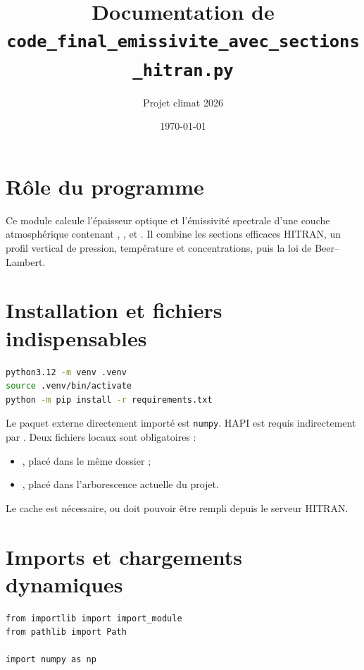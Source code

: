 \documentclass[11pt,a4paper]{article}
\title{Documentation de \texttt{code\_final\_emissivite\_avec\_sections\_hitran.py}}
\author{Projet climat 2026}
\date{\today}
\begin{document}
\maketitle
\tableofcontents

\section{Rôle du programme}

Ce module calcule l'épaisseur optique et l'émissivité spectrale d'une couche
atmosphérique contenant , ,  et . Il combine
les sections efficaces HITRAN, un profil vertical de pression, température et
concentrations, puis la loi de Beer--Lambert.

\section{Installation et fichiers indispensables}

\begin{lstlisting}[language=bash]
python3.12 -m venv .venv
source .venv/bin/activate
python -m pip install -r requirements.txt
\end{lstlisting}

Le paquet externe directement importé est \texttt{numpy}. HAPI est requis
indirectement par . Deux fichiers
locaux sont obligatoires :

\begin{itemize}
  \item {}, placé dans le même dossier ;
  \item {},
        placé dans l'arborescence actuelle du projet.
\end{itemize}

Le cache  est nécessaire, ou doit pouvoir être rempli
depuis le serveur HITRAN.

\section{Imports et chargements dynamiques}

\begin{lstlisting}
from importlib import import_module
from pathlib import Path

import numpy as np
\end{lstlisting}
\end{document}
